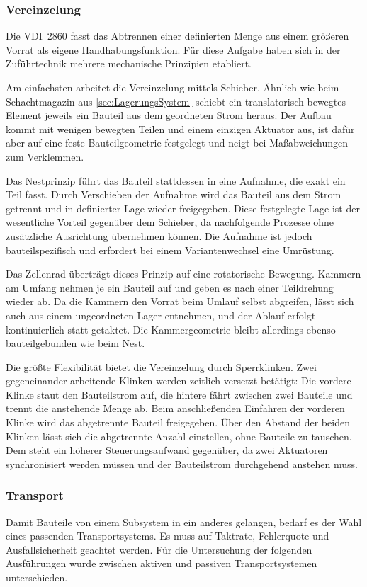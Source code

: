 \subsubsection{Vereinzelung}\label{sec:VereinzelungSystem}
Die VDI~2860 fasst das Abtrennen einer definierten Menge aus einem größeren Vorrat
als eigene Handhabungsfunktion. Für diese Aufgabe haben sich in der Zuführtechnik
mehrere mechanische Prinzipien
etabliert.

Am einfachsten arbeitet die Vereinzelung mittels Schieber. Ähnlich wie beim
Schachtmagazin aus \cref{sec:LagerungsSystem} schiebt ein translatorisch bewegtes
Element jeweils ein Bauteil aus dem geordneten Strom heraus. Der Aufbau kommt mit
wenigen bewegten Teilen und einem einzigen Aktuator aus, ist dafür aber auf eine feste
Bauteilgeometrie festgelegt und neigt bei Maßabweichungen zum Verklemmen.

Das Nestprinzip führt das Bauteil stattdessen in eine Aufnahme, die exakt
ein Teil fasst. Durch Verschieben der Aufnahme wird das Bauteil aus dem Strom
getrennt und in definierter Lage wieder freigegeben. Diese festgelegte Lage ist der
wesentliche Vorteil gegenüber dem Schieber, da nachfolgende Prozesse ohne zusätzliche
Ausrichtung übernehmen können. Die Aufnahme ist jedoch bauteilspezifisch und
erfordert bei einem Variantenwechsel eine Umrüstung.

Das Zellenrad überträgt dieses Prinzip auf eine rotatorische Bewegung.
Kammern am Umfang nehmen je ein Bauteil auf und geben es nach einer Teildrehung
wieder ab. Da die Kammern den Vorrat beim Umlauf selbst abgreifen, lässt sich auch
aus einem ungeordneten Lager entnehmen, und der Ablauf erfolgt kontinuierlich statt
getaktet. Die Kammergeometrie bleibt allerdings ebenso bauteilgebunden wie beim Nest.

Die größte Flexibilität bietet die Vereinzelung durch Sperrklinken. Zwei
gegeneinander arbeitende Klinken werden zeitlich versetzt betätigt: Die vordere
Klinke staut den Bauteilstrom auf, die hintere fährt zwischen zwei Bauteile und
trennt die anstehende Menge ab. Beim anschließenden Einfahren der vorderen Klinke
wird das abgetrennte Bauteil freigegeben. Über den Abstand der beiden Klinken lässt
sich die abgetrennte Anzahl einstellen, ohne Bauteile zu tauschen. Dem steht ein
höherer Steuerungsaufwand gegenüber, da zwei Aktuatoren synchronisiert werden müssen und
der Bauteilstrom durchgehend anstehen muss.
%
\subsubsection{Transport}\label{sec:TransportSystem}
Damit Bauteile von einem Subsystem in ein anderes gelangen, bedarf es der Wahl eines passenden Transportsystems. Es muss auf
Taktrate, Fehlerquote und Ausfallsicherheit geachtet werden. Für die Untersuchung der folgenden Ausführungen
wurde zwischen aktiven und passiven Transportsystemen unterschieden.


